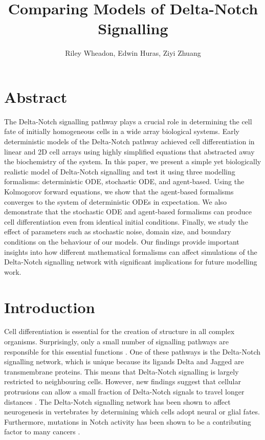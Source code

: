 \documentclass{article}
\title{Comparing Models of Delta-Notch Signalling}
\author{Riley Wheadon, Edwin Huras, Ziyi Zhuang}
\begin{document}
\maketitle

\begin{flushleft}

\section*{Abstract}

The Delta-Notch signalling pathway plays a crucial role in determining the cell fate of initially homogeneous cells in a wide array biological systems.
Early deterministic models of the Delta-Notch pathway achieved cell differentiation in linear and 2D cell arrays using highly simplified equations that abstracted away the biochemistry of the system.
In this paper, we present a simple yet biologically realistic model of Delta-Notch signalling and test it using three modelling formalisms: deterministic ODE, stochastic ODE, and agent-based.
Using the Kolmogorov forward equations, we show that the agent-based formalisms converges to the system of deterministic ODEs in expectation.
We also demonstrate that the stochastic ODE and agent-based formalisms can produce cell differentiation even from identical initial conditions.
Finally, we study the effect of parameters such as stochastic noise, domain size, and boundary conditions on the behaviour of our models.
Our findings provide important insights into how different mathematical formalisms can affect simulations of the Delta-Notch signalling network with significant implications for future modelling work. 

\section*{Introduction}

Cell differentiation is essential for the creation of structure in all complex organisms.
Surprisingly, only a small number of signalling pathways are responsible for this essential functions \cite{bray_notch_2006}.
One of these pathways is the Delta-Notch signalling network, which is unique because its ligands Delta and Jagged are transmembrane proteins.
This means that Delta-Notch signalling is largely restricted to neighbouring cells. 
However, new findings suggest that cellular protrusions can allow a small fraction of Delta-Notch signals to travel longer distances \cite{berkemeier_coupling_2023}.
The Delta-Notch signalling network has been shown to affect neurogenesis in vertebrates by determining which cells adopt neural or glial fates. 
Furthermore, mutations in Notch activity has been shown to be a contributing factor to many cancers \cite{bray_notch_2006}.


\end{flushleft}
\end{document}
